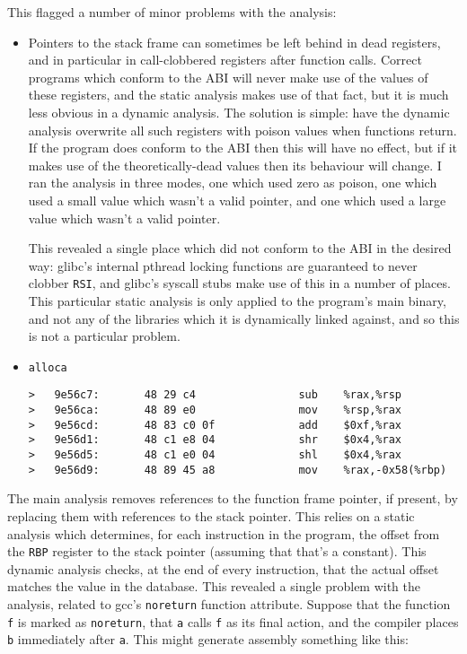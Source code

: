 This flagged a number of minor problems with the analysis:

\begin{itemize}
\item
  Pointers to the stack frame can sometimes be left behind in dead registers, and in particular in call-clobbered registers after function calls.
  Correct programs which conform to the ABI will never make use of the values of these registers, and the static analysis makes use of that fact, but it is much less obvious in a dynamic analysis.
  The solution is simple: have the dynamic analysis overwrite all such registers with poison values when functions return.
  If the program does conform to the ABI then this will have no effect, but if it makes use of the theoretically-dead values then its behaviour will change.
  I ran the analysis in three modes, one which used zero as poison, one which used a small value which wasn't a valid pointer, and one which used a large value which wasn't a valid pointer.

  This revealed a single place which did not conform to the ABI in the desired way: glibc's internal pthread locking functions are guaranteed to never clobber \verb|RSI|, and glibc's syscall stubs make use of this in a number of places.
  This particular static analysis is only applied to the program's main binary, and not any of the libraries which it is dynamically linked against, and so this is not a particular problem.

\item
  \verb|alloca|

\begin{verbatim}
>   9e56c7:       48 29 c4                sub    %rax,%rsp
>   9e56ca:       48 89 e0                mov    %rsp,%rax
>   9e56cd:       48 83 c0 0f             add    $0xf,%rax
>   9e56d1:       48 c1 e8 04             shr    $0x4,%rax
>   9e56d5:       48 c1 e0 04             shl    $0x4,%rax
>   9e56d9:       48 89 45 a8             mov    %rax,-0x58(%rbp)
\end{verbatim}

\end{itemize}


The main analysis removes references to the function frame pointer, if present, by replacing them with references to the stack pointer.
This relies on a static analysis which determines, for each instruction in the program, the offset from the \verb|RBP| register to the stack pointer (assuming that that's a constant).
This dynamic analysis checks, at the end of every instruction, that the actual offset matches the value in the database.
This revealed a single problem with the analysis, related to gcc's \verb|noreturn| function attribute.
Suppose that the function \verb|f| is marked as \verb|noreturn|, that \verb|a| calls \verb|f| as its final action, and the compiler places \verb|b| immediately after \verb|a|.
This might generate assembly something like this:

